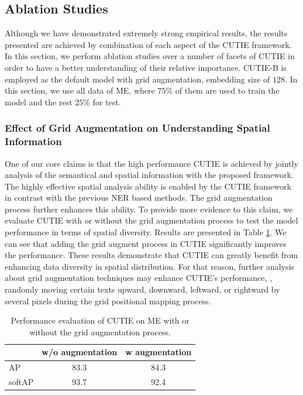 \documentclass[10pt,twocolumn,letterpaper]{article}
\begin{document}
\subsection{Ablation Studies}
Although we have demonstrated extremely strong empirical results, the results presented are achieved by combination of each aspect of the CUTIE framework. In this section, we perform ablation studies over a number of facets of CUTIE in order to have a better understanding of their relative importance. CUTIE-B is employed as the default model with grid augmentation, embedding size of $128$. In this section, we use all data of ME, where $75\%$ of them are used to train the model and the rest $25\%$ for test.

\subsubsection{Effect of Grid Augmentation on Understanding Spatial Information}
One of our core claims is that the high performance CUTIE is achieved by jointly analysis of the semantical and spatial information with the proposed framework. The highly effective spatial analysis ability is enabled by the CUTIE framework in contrast with the previous NER based methods. The grid augmentation process further enhances this ability. To provide more evidence to this claim, we evaluate CUTIE with or without the grid augmentation process to test the model performance in terms of spatial diversity. Results are presented in Table \ref{tab:augmentation}. We can see that adding the grid augment process in CUTIE significantly improves the performance. These results demonstrate that CUTIE can greatly benefit from enhancing data diversity in spatial distribution. For that reason, further analysis about grid augmentation techniques may enhance CUTIE's performance, \eg, randomly moving certain texts upward, downward, leftward, or rightward by several pixels during the grid positional mapping process. 
\begin{table}
	\caption{Performance evaluation of CUTIE on ME with or without the grid augmentation process.}
\begin{center}
\begin{tabular}{l | c | c}
	 & w/o augmentation & w augmentation \\
	\hline
	AP & 83.3 & 84.3 \\
	softAP & 93.7 & 92.4 \\
\end{tabular}
\end{center}
	\label{tab:augmentation}
\end{table}
\end{document}

